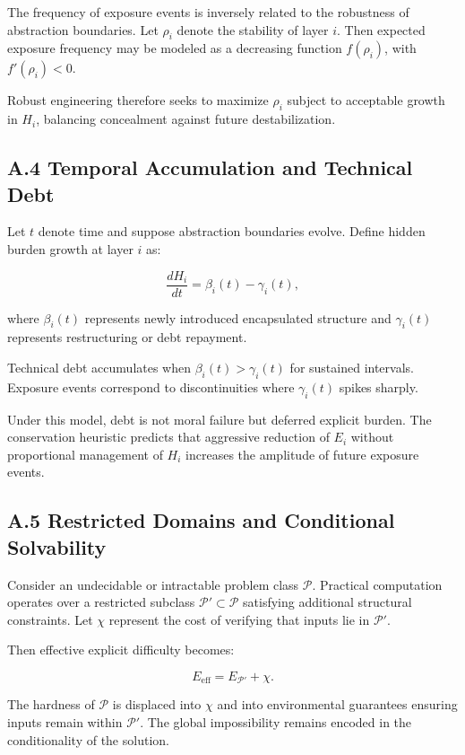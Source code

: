 \documentclass[11pt]{article}
\begin{document}
The frequency of exposure events is inversely related to the robustness of abstraction boundaries. Let $\rho_i$ denote the stability of layer $i$. Then expected exposure frequency may be modeled as a decreasing function $f(\rho_i)$, with $f'(\rho_i) < 0$.

Robust engineering therefore seeks to maximize $\rho_i$ subject to acceptable growth in $H_i$, balancing concealment against future destabilization.

\subsection{A.4 Temporal Accumulation and Technical Debt}

Let $t$ denote time and suppose abstraction boundaries evolve. Define hidden burden growth at layer $i$ as:

\[
\frac{dH_i}{dt} = \beta_i(t) - \gamma_i(t),
\]

where $\beta_i(t)$ represents newly introduced encapsulated structure and $\gamma_i(t)$ represents restructuring or debt repayment.

Technical debt accumulates when $\beta_i(t) > \gamma_i(t)$ for sustained intervals. Exposure events correspond to discontinuities where $\gamma_i(t)$ spikes sharply.

Under this model, debt is not moral failure but deferred explicit burden. The conservation heuristic predicts that aggressive reduction of $E_i$ without proportional management of $H_i$ increases the amplitude of future exposure events.

\subsection{A.5 Restricted Domains and Conditional Solvability}

Consider an undecidable or intractable problem class $\mathcal{P}$. Practical computation operates over a restricted subclass $\mathcal{P}' \subset \mathcal{P}$ satisfying additional structural constraints. Let $\chi$ represent the cost of verifying that inputs lie in $\mathcal{P}'$.

Then effective explicit difficulty becomes:

\[
E_{\text{eff}} = E_{\mathcal{P}'} + \chi.
\]

The hardness of $\mathcal{P}$ is displaced into $\chi$ and into environmental guarantees ensuring inputs remain within $\mathcal{P}'$. The global impossibility remains encoded in the conditionality of the solution.
\end{document}

